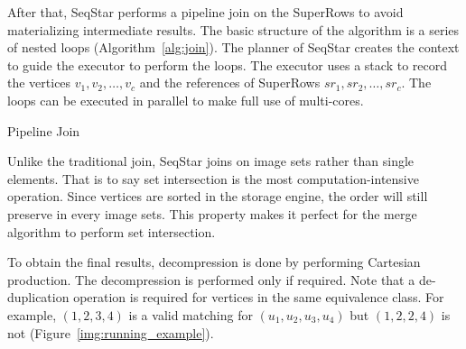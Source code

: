 After that, SeqStar performs a pipeline join on the SuperRows to avoid materializing intermediate results.
The basic structure of the algorithm is a series of nested loops (Algorithm~\ref{alg:join}).
The planner of SeqStar creates the context to guide the executor to perform the loops.
The executor uses a stack to record the vertices $v_1, v_2, \dots, v_c$ and the references of SuperRows $sr_1, sr_2, \dots, sr_c$.
The loops can be executed in parallel to make full use of multi-cores.

\begin{algorithm}[ht]
  \caption{Pipeline Join}\label{alg:join}
\end{algorithm}

Unlike the traditional join, SeqStar joins on image sets rather than single elements.
That is to say set intersection is the most computation-intensive operation.
Since vertices are sorted in the storage engine,
the order will still preserve in every image sets.
This property makes it perfect for the merge algorithm to perform set intersection.

To obtain the final results, decompression is done by performing Cartesian production.
The decompression is performed only if required.
Note that a de-duplication operation is required for vertices in the same equivalence class.
For example, $(1, 2, 3, 4)$ is a valid matching for $(u_1, u_2, u_3, u_4)$ but $(1, 2, 2, 4)$ is not (Figure~\ref{img:running_example}).


